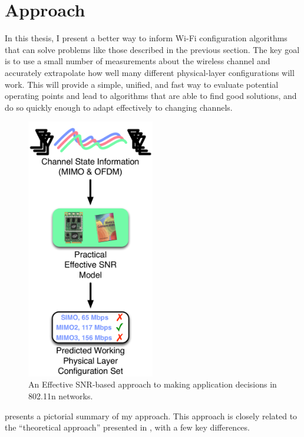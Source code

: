 \section{Approach}
\label{sec:intro_approach}
In this thesis, I present a better way to inform Wi-Fi configuration algorithms that can solve problems like those described in the previous section. The key goal is to use a small number of measurements about the wireless channel and accurately extrapolate how well many different physical-layer configurations will work. This will provide a simple, unified, and fast way to evaluate potential operating points and lead to algorithms that are able to find good solutions, and do so quickly enough to adapt effectively to changing channels.

\begin{figure}[t]
	\centering
	\includegraphics[width=2.2in]{figures/introduction/rate_selection_esnr.pdf}
	\caption[Effective SNR-based approach to making application decisions]{\label{fig:selection_esnr}An Effective SNR-based approach to making application decisions in 802.11n networks.}
\end{figure}

 presents a pictorial summary of my approach. This approach is closely related to the ``theoretical approach'' presented in , with a few key differences.

